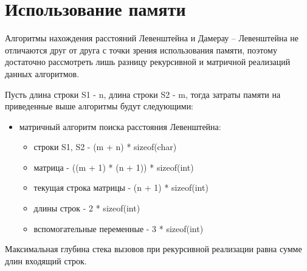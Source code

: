 
\section{Использование памяти}

Алгоритмы нахождения расстояний Левенштейна и Дамерау -- Левенштейна не отличаются друг от друга с точки зрения использования памяти, поэтому достаточно рассмотреть лишь разницу рекурсивной и матричной реализаций данных алгоритмов.

Пусть длина строки S1 - n, длина строки S2 - m, тогда затраты памяти на приведенные выше алгоритмы будут следующими:
\begin{itemize}
	\item матричный алгоритм поиска расстояния Левенштейна:\begin{itemize}
		\item строки S1, S2 - (m + n) * sizeof(char)
		\item матрица - ((m + 1) * (n + 1)) * sizeof(int)
		\item текущая строка матрицы - (n + 1) * sizeof(int)
		\item длины строк - 2 * sizeof(int)
		\item вспомогательные переменные -  3 * sizeof(int)
	\end{itemize}
\end{itemize}

Максимальная глубина стека вызовов при рекурсивной реализации равна сумме длин входящий строк.

